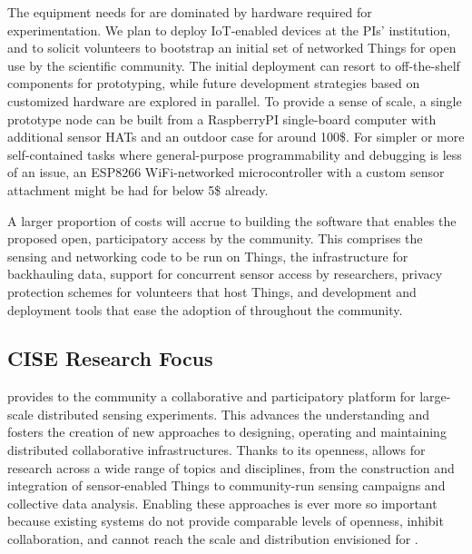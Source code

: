 The equipment needs for \sysname are dominated by hardware required
for experimentation. We plan to deploy \gls{IoT}-enabled devices
at the PIs' institution, and to solicit volunteers to bootstrap an
initial set of networked Things for open use by the scientific community.
The initial deployment can resort to off-the-shelf components
for prototyping, while future development strategies based on
customized hardware are explored in parallel.
To provide a sense of scale, a single prototype node can be built
from a RaspberryPI single-board computer with additional sensor
\glspl{HAT} and an outdoor case for around 100\$.
For simpler or more self-contained tasks where general-purpose
programmability and debugging is less of an issue, an ESP8266
WiFi-networked microcontroller with a custom sensor attachment
might be had for below 5\$ already.

A larger proportion of costs will accrue to building the software
that enables the proposed open, participatory access by the community.
This comprises the sensing and networking code to be run on Things,
the infrastructure for backhauling data, support for concurrent
sensor access by researchers, privacy protection schemes for
volunteers that host Things, and development and deployment tools
that ease the adoption of \sysname throughout the community.


\subsection{CISE Research Focus}

\sysname provides to the community a collaborative and participatory
platform for large-scale distributed sensing experiments. This
advances the understanding and fosters the creation of new
approaches to designing, operating and maintaining distributed
collaborative infrastructures. Thanks to its openness, \sysname
allows for research across a wide range of topics and disciplines,
from the construction and integration of sensor-enabled Things
to community-run sensing campaigns and collective data analysis.
Enabling these approaches is ever more so important because
existing systems do not provide comparable levels of openness,
inhibit collaboration, and cannot reach the scale and distribution
envisioned for \sysname.

